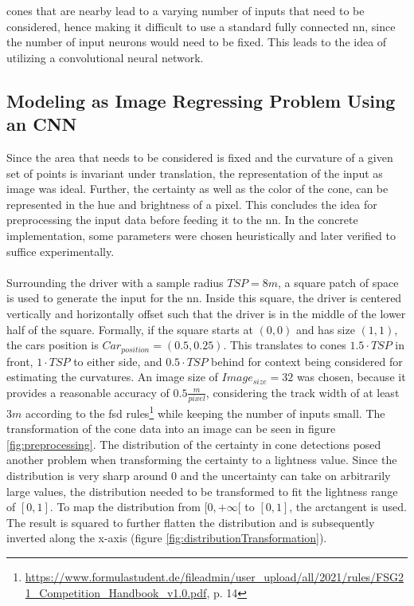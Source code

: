 cones that are nearby lead to a varying number of inputs that need to be considered, hence making it difficult to use a standard fully connected \ac{nn}, since the number of input neurons would need to be fixed. This leads to the idea of utilizing a convolutional neural network.
\subsection{Modeling as Image Regressing Problem Using an CNN}
Since the area that needs to be considered is fixed and the curvature of a given set of points is invariant under translation, the representation of the input as image was ideal. Further, the certainty as well as the color of the cone, can be represented in the hue and brightness of a pixel. This concludes the idea for preprocessing the input data before feeding it to the \ac{nn}. In the concrete implementation, some parameters were chosen heuristically and later verified to suffice experimentally.\\
\\
Surrounding the driver with a sample radius $TSP = 8 m$, a square patch of space is used to generate the input for the \ac{nn}. Inside this square, the driver is centered vertically and horizontally offset such that the driver is in the middle of the lower half of the square. Formally, if the square starts at $(0,0)$ and has size $(1,1)$, the cars position is $Car_{position}=(0.5,0.25)$. This translates to cones $1.5\cdot TSP$ in front, $1\cdot TSP$ to either side, and $0.5\cdot TSP$ behind for context being considered for estimating the curvatures. An image size of $Image_{size}=32$ was chosen, because it provides a reasonable accuracy of $0.5 \frac{m}{pixel}$, considering the track width of at least $3 m$ according to the \ac{fsd} rules\footnote{\url{https://www.formulastudent.de/fileadmin/user_upload/all/2021/rules/FSG21_Competition_Handbook_v1.0.pdf}, p. 14} while keeping the number of inputs small. The transformation of the cone data into an image can be seen in figure \ref{fig:preprocessing}. The distribution of the certainty in cone detections posed another problem when transforming the certainty to a lightness value. Since the distribution is very sharp around 0 and the uncertainty can take on arbitrarily large values, the distribution needed to be transformed to fit the lightness range of $[0,1]$. To map the distribution from $[0,+\infty[$ to $[0,1]$, the arctangent is used. The result is squared to further flatten the distribution and is subsequently inverted along the x-axis (figure \ref{fig:distributionTransformation}). 
